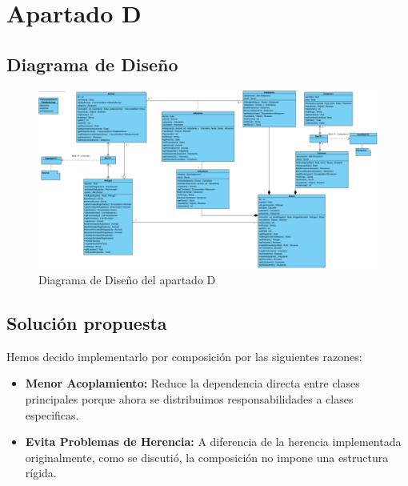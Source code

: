 \section{Apartado D}


\subsection{Diagrama de Diseño}

\begin{figure}[H]
    \centering
     \includegraphics[width=1\linewidth]{assets/Class Diagram1.png}
     \caption{Diagrama de Diseño del apartado D}
\end{figure}

\subsection{Solución propuesta}
Hemos decido implementarlo por composición por las siguientes razones:
\begin{itemize}
    \item \textbf{Menor Acoplamiento:} Reduce la dependencia directa entre clases principales porque ahora se distribuimos responsabilidades a clases especificas.
    \item \textbf{Evita Problemas de Herencia:} A diferencia de la herencia implementada originalmente, como se discutió, la composición no impone una estructura rígida.
\end{itemize}

